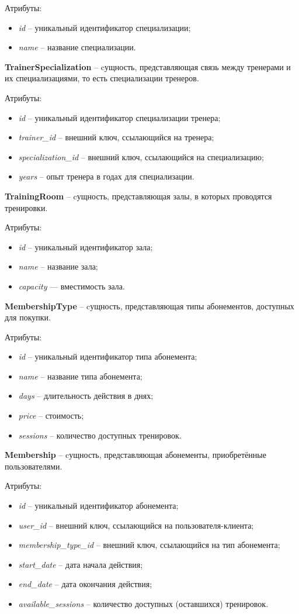 Атрибуты:
\begin{itemize} 
	\item \textit{id} -- уникальный идентификатор специализации; 
	\item \textit{name} -- название специализации.
\end{itemize}

\textbf{TrainerSpecialization} -- cущность, представляющая связь между тренерами и их специализациями, то есть специализации тренеров.

Атрибуты:
\begin{itemize} 
	\item \textit{id} -- уникальный идентификатор специализации тренера;
	\item \textit{trainer\_id} -- внешний ключ, ссылающийся на тренера;
	\item \textit{specialization\_id} -- внешний ключ, ссылающийся на специализацию;
	\item \textit{years} -- опыт тренера в годах для специализации.
\end{itemize}

\textbf{TrainingRoom} -- cущность, представляющая залы, в которых проводятся тренировки.

Атрибуты:
\begin{itemize} 
	\item \textit{id} -- уникальный идентификатор зала;
	\item \textit{name} -- название зала; 
	\item \textit{capacity} — вместимость зала.
\end{itemize}

\textbf{MembershipType} -- cущность, представляющая типы абонементов, доступных для покупки.

Атрибуты:
\begin{itemize} 
	\item \textit{id} -- уникальный идентификатор типа абонемента;
	\item \textit{name} -- название типа абонемента; 
	\item \textit{days} -- длительность действия в днях;
	\item \textit{price} -- стоимость;
	\item \textit{sessions} -- количество доступных тренировок.
\end{itemize}

\textbf{Membership} -- cущность, представляющая абонементы, приобретённые пользователями.

Атрибуты:
\begin{itemize} 
	\item \textit{id} -- уникальный идентификатор абонемента; 
	\item \textit{user\_id} -- внешний ключ, ссылающийся на пользователя-клиента;
	\item \textit{membership\_type\_id} -- внешний ключ, ссылающийся на тип абонемента;
	\item \textit{start\_date} -- дата начала действия;
	\item \textit{end\_date} -- дата окончания действия;
	\item \textit{available\_sessions} -- количество доступных (оставшихся) тренировок.
\end{itemize}

